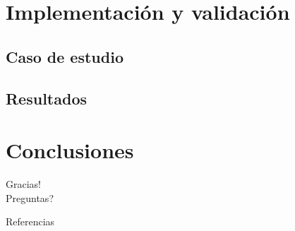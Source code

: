 \documentclass[10pt]{beamer}
\begin{document}

\section{Implementación y validación}


\subsection{Caso de estudio}

\subsection{Resultados}


\section{Conclusiones}



\begin{frame}[standout]
  Gracias!\\
  
  Preguntas?
\end{frame}

\nocite{*}
\begin{frame}[allowframebreaks]{Referencias}
  
  
\end{frame}
\end{document}
